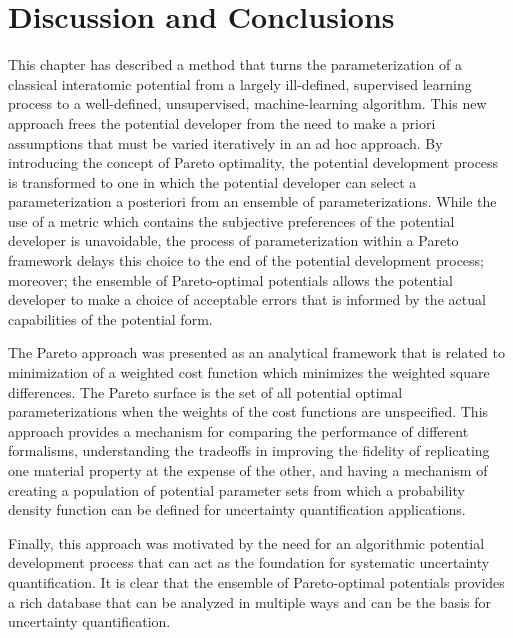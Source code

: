 \section{Discussion and Conclusions}
This chapter has described a method that turns the parameterization of a classical interatomic potential from a largely ill-defined, supervised learning process to a well-defined, unsupervised, machine-learning algorithm.  This new approach frees the potential developer from the need to make a priori assumptions that must be varied iteratively in an ad hoc approach.  By introducing the concept of Pareto optimality, the potential development process is transformed to one in which the potential developer can select a parameterization a posteriori from an ensemble of parameterizations. While the use of a metric which contains the subjective preferences of the potential developer is unavoidable, the process of parameterization within a Pareto framework delays this choice to the end of the potential development process; moreover; the ensemble of Pareto-optimal potentials allows the potential developer to make a choice of acceptable errors that is informed by the actual capabilities of the potential form.

The Pareto approach was presented as an analytical framework that is related to minimization of a weighted cost function which minimizes the weighted square differences. The Pareto surface is the set of all potential optimal parameterizations when the weights of the cost functions are unspecified. This approach provides a mechanism for comparing the performance of different formalisms, understanding the tradeoffs in improving the fidelity of replicating one material property at the expense of the other, and having a mechanism of creating a population of potential parameter sets from which a probability density function can be defined for uncertainty quantification applications.

Finally, this approach was motivated by the need for an algorithmic potential development process that can act as the foundation for systematic uncertainty quantification. It is clear that the ensemble of Pareto-optimal potentials provides a rich database that can be analyzed in multiple ways and can be the basis for uncertainty quantification.
